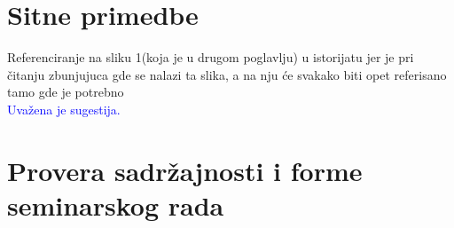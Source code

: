 \documentclass[a4paper]{report}
\newcommand{\odgovor}[1]{\textcolor{blue}{#1}}
\begin{document}
\section{Sitne primedbe}
Referenciranje na sliku 1(koja je u drugom poglavlju) u istorijatu jer je pri čitanju zbunjujuca gde se nalazi ta slika, a na nju će svakako biti opet referisano tamo gde je potrebno\\
\odgovor{Uvažena je sugestija.}

\section{Provera sadržajnosti i forme seminarskog rada}
\end{document}
